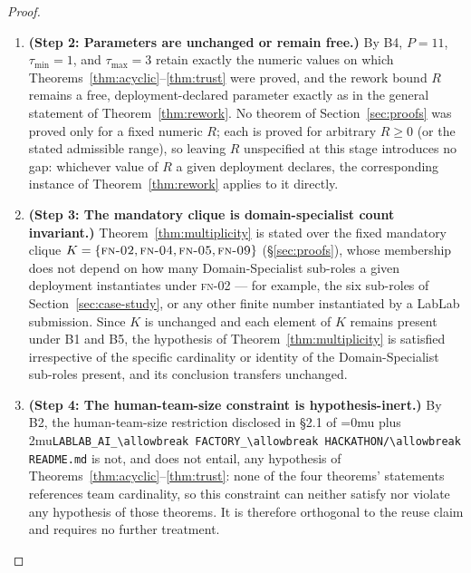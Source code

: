 \documentclass[12pt]{article}
\theoremstyle{definition}
\DeclareRobustCommand{\code}[1]{\begingroup\Urlmuskip=0mu plus 2mu\relax\nolinkurl{#1}\endgroup}
\newcommand{\FN}[1]{\textsc{fn-#1}}
\newcommand{\LabLabFactoryReadme}{\code{LABLAB\_AI\_\allowbreak FACTORY\_\allowbreak HACKATHON/\allowbreak README.md}}
\begin{document}
\begin{proof}
\begin{enumerate}
    \item \textbf{(Step 2: Parameters are unchanged or remain free.)}
          By B4, $P = 11$, $\tau_{\min} = 1$, and $\tau_{\max} = 3$
          retain exactly the numeric values on which
          Theorems~\ref{thm:acyclic}--\ref{thm:trust} were proved, and
          the rework bound $R$ remains a free, deployment-declared
          parameter exactly as in the general statement of
          Theorem~\ref{thm:rework}. No theorem of
          Section~\ref{sec:proofs} was proved only for a fixed numeric
          $R$; each is proved for arbitrary $R \geq 0$ (or the stated
          admissible range), so leaving $R$ unspecified at this stage
          introduces no gap: whichever value of $R$ a given deployment
          declares, the corresponding instance of
          Theorem~\ref{thm:rework} applies to it directly.

    \item \textbf{(Step 3: The mandatory clique is domain-specialist
          count invariant.)} Theorem~\ref{thm:multiplicity} is stated
          over the fixed mandatory clique
          $K = \{\FN{02}, \FN{04}, \FN{05}, \FN{09}\}$
          (\S\ref{sec:proofs}), whose membership does not depend on
          how many Domain-Specialist sub-roles a given deployment
          instantiates under \FN{02} --- for example, the six
          sub-roles of Section~\ref{sec:case-study}, or any other
          finite number instantiated by a LabLab submission. Since $K$
          is unchanged and each element of $K$ remains present under
          B1 and B5, the hypothesis of Theorem~\ref{thm:multiplicity}
          is satisfied irrespective of the specific cardinality or
          identity of the Domain-Specialist sub-roles present, and its
          conclusion transfers unchanged.

    \item \textbf{(Step 4: The human-team-size constraint is
          hypothesis-inert.)} By B2, the human-team-size restriction
          disclosed in \S2.1 of \LabLabFactoryReadme{} is not, and
          does not entail, any hypothesis of
          Theorems~\ref{thm:acyclic}--\ref{thm:trust}: none of the four
          theorems' statements references team cardinality, so this
          constraint can neither satisfy nor violate any hypothesis of
          those theorems. It is therefore orthogonal to the reuse
          claim and requires no further treatment.


\end{enumerate}
\end{proof}
\end{document}
